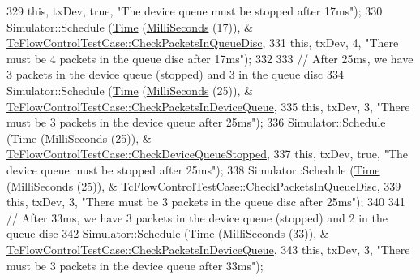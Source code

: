 \begin{DoxyCode}
329                           \textcolor{keyword}{this}, txDev, \textcolor{keyword}{true}, \textcolor{stringliteral}{"The device queue must be stopped after 17ms"});
330       Simulator::Schedule (\hyperlink{classns3_1_1Time}{Time} (\hyperlink{group__timecivil_gaf26127cf4571146b83a92ee18679c7a9}{MilliSeconds} (17)), &
      \hyperlink{classTcFlowControlTestCase_ac6d0b6a74dd29a21369bf1d26795098d}{TcFlowControlTestCase::CheckPacketsInQueueDisc},
331                           \textcolor{keyword}{this}, txDev, 4, \textcolor{stringliteral}{"There must be 4 packets in the queue disc after 17ms"});
332 
333       \textcolor{comment}{// After 25ms, we have 3 packets in the device queue (stopped) and 3 in the queue disc}
334       Simulator::Schedule (\hyperlink{classns3_1_1Time}{Time} (\hyperlink{group__timecivil_gaf26127cf4571146b83a92ee18679c7a9}{MilliSeconds} (25)), &
      \hyperlink{classTcFlowControlTestCase_a7ad467b39fdb155daea4b048619f6d12}{TcFlowControlTestCase::CheckPacketsInDeviceQueue},
335                           \textcolor{keyword}{this}, txDev, 3, \textcolor{stringliteral}{"There must be 3 packets in the device queue after 25ms"});
336       Simulator::Schedule (\hyperlink{classns3_1_1Time}{Time} (\hyperlink{group__timecivil_gaf26127cf4571146b83a92ee18679c7a9}{MilliSeconds} (25)), &
      \hyperlink{classTcFlowControlTestCase_a4ccc9564c9142984fa8041f67b4a518a}{TcFlowControlTestCase::CheckDeviceQueueStopped},
337                           \textcolor{keyword}{this}, txDev, \textcolor{keyword}{true}, \textcolor{stringliteral}{"The device queue must be stopped after 25ms"});
338       Simulator::Schedule (\hyperlink{classns3_1_1Time}{Time} (\hyperlink{group__timecivil_gaf26127cf4571146b83a92ee18679c7a9}{MilliSeconds} (25)), &
      \hyperlink{classTcFlowControlTestCase_ac6d0b6a74dd29a21369bf1d26795098d}{TcFlowControlTestCase::CheckPacketsInQueueDisc},
339                           \textcolor{keyword}{this}, txDev, 3, \textcolor{stringliteral}{"There must be 3 packets in the queue disc after 25ms"});
340 
341       \textcolor{comment}{// After 33ms, we have 3 packets in the device queue (stopped) and 2 in the queue disc}
342       Simulator::Schedule (\hyperlink{classns3_1_1Time}{Time} (\hyperlink{group__timecivil_gaf26127cf4571146b83a92ee18679c7a9}{MilliSeconds} (33)), &
      \hyperlink{classTcFlowControlTestCase_a7ad467b39fdb155daea4b048619f6d12}{TcFlowControlTestCase::CheckPacketsInDeviceQueue},
343                           \textcolor{keyword}{this}, txDev, 3, \textcolor{stringliteral}{"There must be 3 packets in the device queue after 33ms"});

\end{DoxyCode}

